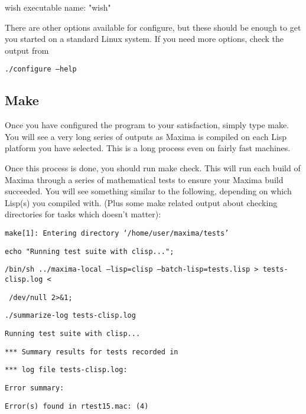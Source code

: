 wish executable name: "wish"

\vspace{3ex}


There are other options available for configure, but these should be enough
to get you started on a standard Linux system.  If you need more options, check
the output from

\vspace{3ex}

\texttt{./configure --help}

\subsection{Make}

Once you have configured the program to your satisfaction, simply type make.
You will see a very long series of outputs as Maxima is compiled on each Lisp
platform you have selected.  This is a long process even on fairly fast 
machines.

Once this process is done, you should run make check.  This will run each build
of Maxima through a series of mathematical tests to ensure your Maxima build
succeeded.  You will see something similar to the following, depending on
which Lisp(s) you compiled with. (Plus some make
related output about checking directories for tasks which doesn't matter):

\vspace{3ex}

\texttt{make[1]: Entering directory `/home/user/maxima/tests'}

\texttt{echo "Running test suite with clisp..."; \ }

\vspace{2ex}

\texttt{/bin/sh ../maxima-local --lisp=clisp --batch-lisp=tests.lisp > tests-clisp.log <}

\texttt{ /dev/null 2>\&1; \ }

\texttt{./summarize-log tests-clisp.log}

\texttt{Running test suite with clisp...}

\vspace{2ex}

\texttt{*** Summary results for tests recorded in}

\texttt{*** log file tests-clisp.log:}

\texttt{Error summary:}

\texttt{Error(s) found in rtest15.mac: (4)}

